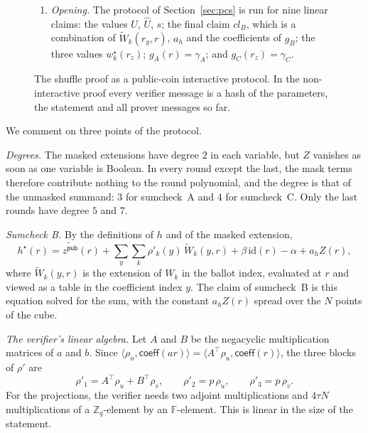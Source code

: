 \documentclass[sigconf,anonymous]{acmart}
\newcommand{\Zq}{\mathbb{Z}_q}
\newcommand{\F}{\mathbb{F}}
\newcommand{\cube}[1]{\{0,1\}^{#1}}
\newcommand{\eq}{\mathsf{eq}}
\newcommand{\coeff}{\mathsf{coeff}}
\newcommand{\ip}[2]{\langle #1, #2\rangle}
\newcommand{\mle}[1]{\widetilde{#1}}
\newcommand{\msk}[1]{#1^{\star}}
\begin{document}
\begin{figure}[t]
{\begin{minipage}{0.975\textwidth}
\begin{enumerate}[leftmargin=1.6em,itemsep=2pt,topsep=3pt]
  \[ \sum_{x\in\cube{m}}\Bigl[\eq(t_z,x)\sum_{k=1}^{3}k^C_k\bigl((\msk{w}_k)^{3}-\msk{w}_k\bigr)
       +\rho_C\,g_C\Bigr](x)\;=\;\rho_C G_C . \]
  It ends at a point $r_z$. $P$ sends $\msk{w}_k(r_z)$ for $k=1,2,3$, and $V$ derives the value
  $\gamma_C$ that $g_C(r_z)$ must take.
\item[\textbf{7.}] \emph{Opening.} The protocol of Section~\ref{sec:pcs} is run for nine linear
  claims: the values $U$, $\hat U$, $s$; the final claim $\mathit{cl}_B$, which is a combination
  of $\mle{W}_k(r_y,r)$, $a_h$ and the coefficients of $g_B$; the three values $\msk{w}_k(r_z)$;
  $g_A(r)=\gamma_A$; and $g_C(r_z)=\gamma_C$.
\end{enumerate}
\end{minipage}}
\caption{The shuffle proof as a public-coin interactive protocol. In the non-interactive proof
every verifier message is a hash of the parameters, the statement and all prover messages so
far.}
\label{fig:mix}
\end{figure}

We comment on three points of the protocol.

\emph{Degrees.} The masked extensions have degree $2$ in each variable, but $Z$ vanishes as soon as
one variable is Boolean. In every round except the last, the mask terms therefore contribute
nothing to the round polynomial, and the degree is that of the unmasked summand: $3$ for
sumcheck~A and $4$ for sumcheck~C. Only the last rounds have degree $5$ and $7$.

\emph{Sumcheck B.} By the definitions of $h$ and of the masked extension,
\[
  \msk{h}(r)=\mle{z^{\mathsf{pub}}}(r)+\sum_{y}\sum_{k}\rho'_k(y)\,\mle{W}_k(y,r)
            +\beta\,\mathrm{id}(r)-\alpha+a_hZ(r),
\]
where $\mle{W}_k(y,r)$ is the extension of $W_k$ in the ballot index, evaluated at $r$ and viewed as
a table in the coefficient index $y$. The claim of sumcheck~B is this equation solved for the sum,
with the constant $a_hZ(r)$ spread over the $N$ points of the cube.

\emph{The verifier's linear algebra.} Let $A$ and $B$ be the negacyclic multiplication matrices of
$a$ and $b$. Since $\ip{\rho_u}{\coeff(ar)}=\ip{A^{\!\top}\rho_u}{\coeff(r)}$, the three blocks of
$\rho'$ are
\[
  \rho'_1=A^{\!\top}\rho_u+B^{\top}\rho_v,\qquad \rho'_2=p\,\rho_u,\qquad \rho'_3=p\,\rho_v .
\]
For the projections, the verifier needs two adjoint multiplications and $4\tau N$ multiplications of
a $\Zq$-element by an $\F$-element. This is linear in the size of the statement.
\end{document}
